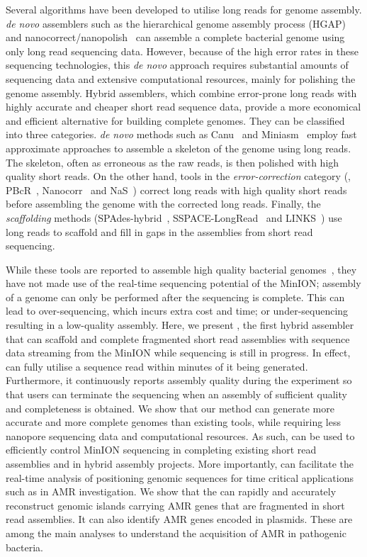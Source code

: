 Several algorithms have been developed to utilise long reads for genome
assembly. \emph{de novo} assemblers such as the hierarchical genome assembly
process (HGAP)~\cite{ChinAM2013} and nanocorrect/nanopolish~\cite{LomanQS2015}
can assemble a complete bacterial genome using only long read sequencing data.
However, because of the high error rates in these sequencing technologies, this
\emph{de novo} approach requires substantial amounts of sequencing data and
extensive computational resources, mainly for polishing the genome assembly. 
Hybrid assemblers, which combine error-prone long reads with highly accurate
and cheaper short read sequence data, provide a more economical and efficient
alternative for building complete genomes. They can be classified into three
categories. \emph{de novo} methods such as Canu~\cite{BerlinKC2015} and
Miniasm~\cite{Li2016} employ fast approximate approaches to assemble a skeleton
of the genome using long reads. The skeleton, often as erroneous as the raw
reads, is then polished with high quality short reads. On the other hand, tools
in the \emph{error-correction} category (\EG, PBcR~\cite{KorenSW2012},
Nanocorr~\cite{GoodwinGE2015} and NaS~\cite{MadouiEC2015}) correct long reads
with high quality short reads before assembling the genome with the corrected
long reads. Finally, the \emph{scaffolding} methods
(SPAdes-hybrid~\cite{BankevichNA2012, AshtonND2015},
SSPACE-LongRead~\cite{BoetzerP2014, KarlssonLS2015} and
LINKS~\cite{WarrenYV2015}) use long reads to scaffold and fill in gaps in the
assemblies from short read sequencing.

While these tools are reported to assemble high quality bacterial
genomes~\cite{Castro-WallaceCJ2016, IstaceFD2016}, they have not made use of
the real-time sequencing potential of the MinION; assembly of a genome can only
be performed after the sequencing is complete. This can lead to over-sequencing,
which incurs extra cost and time; or under-sequencing resulting in a low-quality
assembly. Here, we present \npscarf{}, the first hybrid assembler that can
scaffold and complete fragmented short read assemblies with sequence data
streaming from the MinION while sequencing is still in progress. 
In effect, \npscarf{} can fully utilise a sequence read within
minutes of it being generated. Furthermore, it continuously reports
assembly quality during the experiment so that users can terminate the sequencing 
when an assembly of sufficient quality and completeness is obtained.
We show that our method can generate more accurate and more
complete genomes than existing tools, while requiring less nanopore sequencing
data and computational resources. As such, \npscarf{} can be used to efficiently
control MinION sequencing in completing existing short read assemblies and in
hybrid assembly projects. More importantly, \npscarf{} can facilitate the
real-time analysis of positioning genomic sequences for time critical
applications such as in AMR investigation.
We show that the \npscarf{} can rapidly and accurately reconstruct genomic islands
carrying AMR genes that are fragmented in short read assemblies. It can also
identify AMR genes encoded in plasmids. These are among the main analyses to
understand the acquisition of AMR in pathogenic bacteria.


